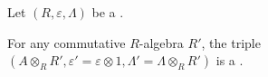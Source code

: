 \begin{lemma} \label{lemma:base_change_of_a_commutative_unitary_ring_by_a_unitary_algebra_is_a_unitary_algebra}
    Let $(R, \varepsilon, \Lambda)$ be a  .

    For any commutative $R$-algebra $R'$, the triple $(A \otimes_R R', \varepsilon' = \varepsilon \otimes 1, \Lambda' = \Lambda \otimes_R R')$ is a .
\end{lemma}